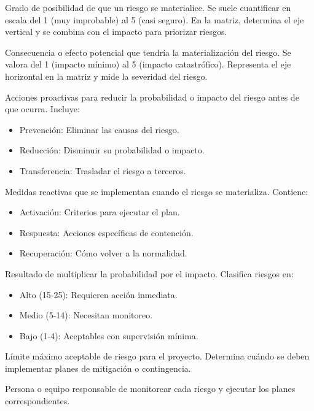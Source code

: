 \begin{description}[leftmargin=1cm, style=nextline]

\item[\textbf{Probabilidad}]
Grado de posibilidad de que un riesgo se materialice. Se suele cuantificar en escala del 1 (muy improbable) al 5 (casi seguro). En la matriz, determina el eje vertical y se combina con el impacto para priorizar riesgos.

\item[\textbf{Impacto}]
Consecuencia o efecto potencial que tendría la materialización del riesgo. Se valora del 1 (impacto mínimo) al 5 (impacto catastrófico). Representa el eje horizontal en la matriz y mide la severidad del riesgo.

\item[\textbf{Plan de Mitigación}]
Acciones proactivas para reducir la probabilidad o impacto del riesgo antes de que ocurra. Incluye:
\begin{itemize}
\item Prevención: Eliminar las causas del riesgo.
\item Reducción: Disminuir su probabilidad o impacto.
\item Transferencia: Trasladar el riesgo a terceros.
\end{itemize}

\item[\textbf{Plan de Contingencia}]
Medidas reactivas que se implementan cuando el riesgo se materializa. Contiene:
\begin{itemize}
\item Activación: Criterios para ejecutar el plan.
\item Respuesta: Acciones específicas de contención.
\item Recuperación: Cómo volver a la normalidad.
\end{itemize}

\item[\textbf{Nivel de Riesgo}]
Resultado de multiplicar la probabilidad por el impacto. Clasifica riesgos en:
\begin{itemize}
\item Alto (15-25): Requieren acción inmediata.
\item Medio (5-14): Necesitan monitoreo.
\item Bajo (1-4): Aceptables con supervisión mínima.
\end{itemize}

\item[\textbf{Umbral de Riesgo}]
Límite máximo aceptable de riesgo para el proyecto. Determina cuándo se deben implementar planes de mitigación o contingencia.

\item[\textbf{Propietario del Riesgo}]
Persona o equipo responsable de monitorear cada riesgo y ejecutar los planes correspondientes.

\end{description}


